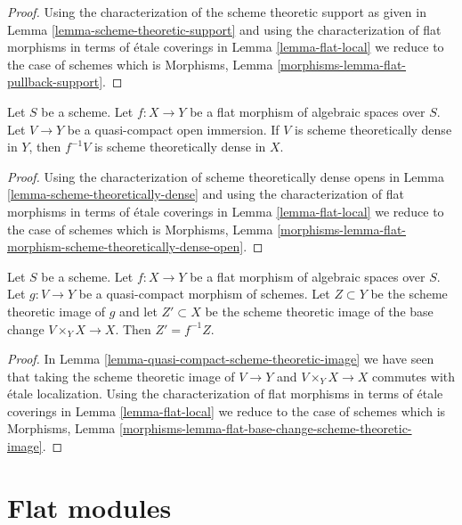 \begin{proof}
Using the characterization of the scheme theoretic support
as given in Lemma \ref{lemma-scheme-theoretic-support}
and using the characterization of flat morphisms in terms of
\'etale coverings in Lemma \ref{lemma-flat-local}
we reduce to the case of schemes which is
Morphisms, Lemma \ref{morphisms-lemma-flat-pullback-support}.
\end{proof}

\begin{lemma}
\label{lemma-flat-morphism-scheme-theoretically-dense-open}
Let $S$ be a scheme.
Let $f : X \to Y$ be a flat morphism of algebraic spaces over $S$.
Let $V \to Y$ be a quasi-compact open immersion. If $V$
is scheme theoretically dense in $Y$, then $f^{-1}V$
is scheme theoretically dense in $X$.
\end{lemma}

\begin{proof}
Using the characterization of scheme theoretically dense opens
in Lemma \ref{lemma-scheme-theoretically-dense}
and using the characterization of flat morphisms in terms of
\'etale coverings in Lemma \ref{lemma-flat-local}
we reduce to the case of schemes which is
Morphisms, Lemma
\ref{morphisms-lemma-flat-morphism-scheme-theoretically-dense-open}.
\end{proof}

\begin{lemma}
\label{lemma-flat-base-change-scheme-theoretic-image}
Let $S$ be a scheme. Let $f : X \to Y$ be a flat morphism of algebraic spaces
over $S$. Let $g : V \to Y$ be a quasi-compact morphism of schemes. Let
$Z \subset Y$ be the scheme theoretic image of $g$ and let $Z' \subset X$
be the scheme theoretic image of the base change $V \times_Y X \to X$.
Then $Z' = f^{-1}Z$.
\end{lemma}

\begin{proof}
In Lemma \ref{lemma-quasi-compact-scheme-theoretic-image}
we have seen that taking the scheme theoretic image
of $V \to Y$ and $V \times_Y X \to X$ commutes with
\'etale localization. Using the characterization of flat morphisms
in terms of \'etale coverings in Lemma \ref{lemma-flat-local}
we reduce to the case of schemes which is
Morphisms, Lemma
\ref{morphisms-lemma-flat-base-change-scheme-theoretic-image}.
\end{proof}





\section{Flat modules}
\label{section-flat-modules}

